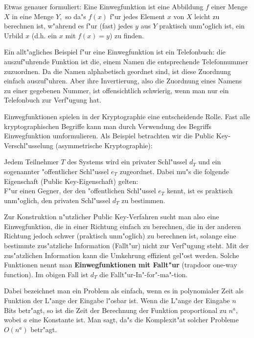 Etwas genauer formuliert:  Eine Einwegfunktion ist eine Abbildung $ f $ einer Menge $ X $ in eine Menge $ Y, $ so da"s $ f(x) $ f"ur jedes Element $ x $ von $ X $ leicht zu berechnen ist, w"ahrend es f"ur (fast) jedes $ y $ aus $ Y $  praktisch unm"oglich ist, ein Urbild $ x $ (d.h. ein $ x $ mit $ f(x)=y $) zu finden.\par

Ein allt"agliches Beispiel f"ur eine Einwegfunktion ist ein Telefonbuch: die auszuf"uhrende Funktion ist die, einem Namen die entsprechende Telefonnummer zuzuordnen. Da die Namen alphabetisch geordnet sind, ist diese Zuordnung einfach auszuf"uhren. Aber ihre Invertierung, also die Zuordnung eines Namens zu einer gegebenen Nummer, ist offensichtlich schwierig, wenn man nur ein Telefonbuch zur Verf"ugung hat. \par

Einwegfunktionen spielen in der Kryptographie eine entscheidende Rolle. Fast alle kryptographischen Begriffe kann man durch Verwendung des Begriffs Einwegfunktion umformulieren. Als Beispiel betrachten wir die Public Key-Verschl"usselung  (asymmetrische Kryptographie):\par

Jedem Teilnehmer $ T $ des Systems wird ein privater   Schl"ussel $ d_T $   und ein sogenannter "offentlicher Schl"ussel $ e_T $   zugeordnet. Dabei mu"s die folgende Eigenschaft (Public Key-Eigenschaft) gelten:\\
F"ur einen Gegner, der den "offentlichen Schl"ussel $ e_T $  kennt, ist es praktisch unm"oglich, den privaten Schl"ussel  $ d_T $ zu bestimmen.\par

Zur Konstruktion n"utzlicher Public Key-Verfahren sucht man also eine Einwegfunktion, die in einer Richtung \glqq einfach\grqq {} zu berechnen, die in der anderen Richtung jedoch \glqq schwer\grqq {} (praktisch unm"oglich) zu berechnen ist, solange eine bestimmte zus"atzliche Information  (Fallt"ur) nicht zur Verf"ugung steht. Mit der zus"atzlichen Information kann die Umkehrung effizient gel"ost werden. Solche Funktionen nennt man {\bf Einwegfunktionen mit Fallt"ur} (trapdoor one-way function). Im obigen Fall ist $ d_T $ die Fallt"ur-In"-for"-ma"-tion. \par

Dabei bezeichnet man ein Problem als \glqq einfach\grqq, wenn es in  polynomialer Zeit als Funktion der L"ange der Eingabe l"osbar ist. Wenn die L"ange der Eingabe $ n $ Bits betr"agt, so ist die Zeit der Berechnung der Funktion proportional zu $ n^{a}, $ wobei $ a $  eine Konstante ist. Man sagt, da"s die  Komplexit"at solcher Probleme $ O(n^{a}) $ betr"agt. 



